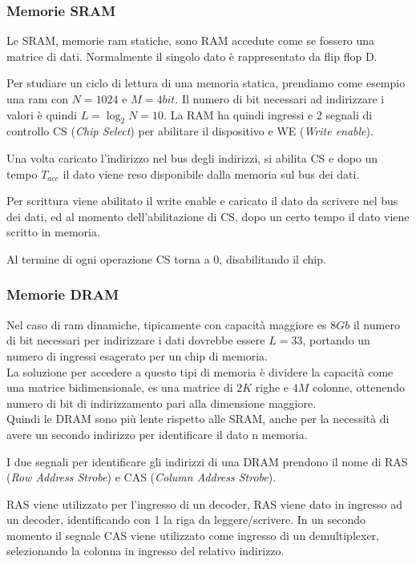 \documentclass[../template]{subfiles}
\begin{document}
\subsubsection{Memorie SRAM}
Le SRAM, memorie ram statiche, sono RAM accedute come se fossero una matrice di dati.
Normalmente il singolo dato è rappresentato da flip flop D.

Per studiare un ciclo di lettura di una memoria statica, prendiamo come esempio una ram con $N=1024$ e $M = 4bit$.
Il numero di bit necessari ad indirizzare i valori è quindi $L = \log_2 N = 10$.
La RAM ha quindi ingressi e 2 segnali di controllo CS (\textit{Chip Select}) per abilitare il dispositivo e WE (\textit{Write enable}).

Una volta caricato l'indirizzo nel bus degli indirizzi, si abilita CS e dopo un tempo $T_{acc}$ il dato viene reso disponibile dalla memoria sul bus dei dati.

Per scrittura viene abilitato il write enable e caricato il dato da scrivere nel bus dei dati, ed al momento dell'abilitazione di CS, dopo un certo tempo il dato viene scritto in memoria.

Al termine di ogni operazione CS torna a 0, disabilitando il chip.
\subsubsection{Memorie DRAM}
Nel caso di ram dinamiche, tipicamente con capacità maggiore es $8Gb$ il numero di bit necessari per indirizzare i dati dovrebbe essere $L=33$, portando un numero di ingressi esagerato per un chip di memoria.
\\
La soluzione per accedere a questo tipi di memoria è dividere la capacità come una matrice bidimensionale, es una matrice di $2K$ righe e $4M$ colonne, ottenendo numero di bit di indirizzamento pari alla dimensione maggiore.
\\
Quindi le DRAM sono più lente rispetto alle SRAM, anche per la necessità di avere un secondo indirizzo per identificare il dato n memoria.

I due segnali per identificare gli indirizzi di una DRAM prendono il nome di RAS (\textit{Row Address Strobe}) e CAS (\textit{Column Address Strobe}).

RAS viene utilizzato per l'ingresso di un decoder,
RAS viene dato in ingresso ad un decoder, identificando con 1 la riga da leggere/scrivere. In un secondo momento il segnale CAS viene utilizzato come ingresso di un demultiplexer, selezionando la colonna in ingresso del relativo indirizzo.
\end{document}
